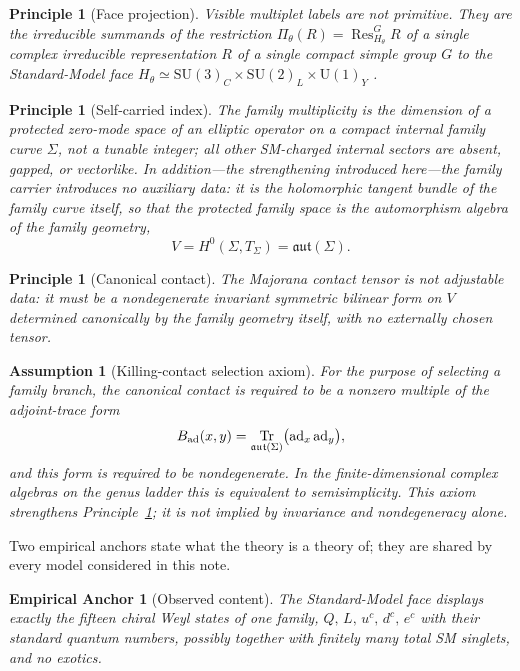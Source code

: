 \documentclass[
  aps,
  prd,
  preprint,
  nofootinbib,
  superscriptaddress,
  longbibliography
]{revtex4-2}
\newcommand{\SU}{\mathrm{SU}}
\newcommand{\U}{\mathrm{U}}
\newcommand{\aut}{\mathfrak{aut}}
\DeclareMathOperator{\Tr}{Tr}
\DeclareMathOperator{\Res}{Res}
\newtheorem{assumption}[theorem]{Assumption}
\newtheorem{principle}[theorem]{Principle}
\newtheorem{anchor}[theorem]{Empirical Anchor}
\begin{document}
\begin{principle}[Face projection]
\label{pr:face}
Visible multiplet labels are not primitive.  They are the irreducible
summands of the restriction
\(\Pi_\theta(R)=\Res^{G}_{H_\theta}R\)
of a \emph{single} complex irreducible representation \(R\) of a
\emph{single} compact simple group \(G\) to the Standard-Model face
\(H_\theta\simeq\SU(3)_C\times\SU(2)_L\times\U(1)_Y\)
\cite{PatiSalam1974,Georgi1975,FritzschMinkowski1975,Slansky1981}.
\end{principle}

\begin{principle}[Self-carried index]
\label{pr:index}
The family multiplicity is the dimension of a protected zero-mode space of
an elliptic operator on a compact internal family curve \(\Sigma\), not a
tunable integer; all other SM-charged internal sectors are absent, gapped,
or vectorlike.  In addition---the strengthening introduced here---the
family carrier introduces no auxiliary data: it is the holomorphic tangent
bundle of the family curve itself, so that the protected family space
\emph{is} the automorphism algebra of the family geometry,
\[
  V=H^0(\Sigma,T_\Sigma)=\aut(\Sigma).
\]
\end{principle}

\begin{principle}[Canonical contact]
\label{pr:contact}
The Majorana contact tensor is not adjustable data: it must be a
nondegenerate invariant symmetric bilinear form on \(V\) determined
canonically by the family geometry itself, with no externally chosen
tensor.
\end{principle}

\begin{assumption}[Killing-contact selection axiom]
\label{an:killingcontact}
For the purpose of selecting a family branch, the canonical contact is
required to be a nonzero multiple of the adjoint-trace form
\[
  B_{\rm ad}(x,y)=\Tr_{\aut(\Sigma)}
  \bigl(\operatorname{ad}_x\operatorname{ad}_y\bigr),
\]
and this form is required to be nondegenerate.  In the finite-dimensional
complex algebras on the genus ladder this is equivalent to semisimplicity.
This axiom strengthens Principle~\ref{pr:contact}; it is not implied by
invariance and nondegeneracy alone.
\end{assumption}

Two empirical anchors state what the theory is a theory of; they are shared
by every model considered in this note.

\begin{anchor}[Observed content]
\label{an:content}
The Standard-Model face displays exactly the fifteen chiral Weyl states of
one family, \(Q,\,L,\,u^c,\,d^c,\,e^c\) with their standard quantum
numbers, possibly together with finitely many total SM singlets, and no
exotics.
\end{anchor}
\end{document}
